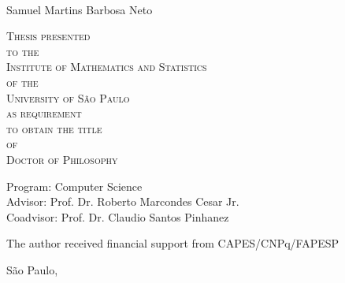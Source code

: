 \documentclass[11pt,twoside,a4paper]{book}
\begin{document}
\hypersetup{pageanchor=false}
\frontmatter
\fancyhead[RO]{{\footnotesize\rightmark}\hspace{2em}\thepage}
\setcounter{tocdepth}{2}
\fancyhead[LE]{\thepage\hspace{2em}\footnotesize{\leftmark}}
\fancyhead[RE,LO]{}
\fancyhead[RO]{{\footnotesize\rightmark}\hspace{2em}\thepage}

\onehalfspacing  %

\thispagestyle{empty}
\begin{center}
    \vspace*{2.3cm}
    \textbf{\Large{\phdTitle}}\\
    
    \vspace*{1.2cm}
    \Large{Samuel Martins Barbosa Neto}
    
    \vskip 2cm
    \textsc{
    Thesis presented\\[-0.25cm] 
    to the\\[-0.25cm]
    Institute of Mathematics and Statistics\\[-0.25cm]
    of the\\[-0.25cm]
    University of São Paulo\\[-0.25cm]
    as requirement\\[-0.25cm]
    to obtain the title\\[-0.25cm]
    of\\[-0.25cm]
    Doctor of Philosophy}
    
    \vskip 1.5cm
    Program: Computer Science\\
    Advisor: Prof. Dr. Roberto Marcondes Cesar Jr.\\
    Coadvisor: Prof. Dr. Claudio Santos Pinhanez

       \vskip 1cm
    \normalsize{The author received financial support from CAPES/CNPq/FAPESP}
    
    \vskip 0.5cm
    \normalsize{São Paulo, \thesisMonth~\thesisYear}
\end{center}

%
%
%
\newpage
\thispagestyle{empty}
    \begin{center}
        \vspace*{2.3 cm}
        \textbf{\Large{\phdTitle}}\\
        \vspace*{2 cm}
    \end{center}
\end{document}
